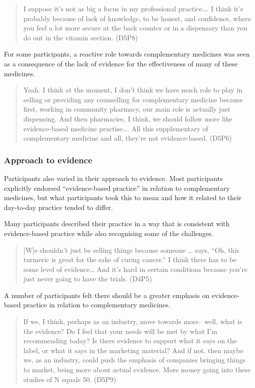 \documentclass[11pt,a4paper]{article}
\begin{document}
\begin{quote}
I suppose it's not as big a focus in my professional practice\ldots{}. I
think it's probably because of lack of knowledge, to be honest, and
confidence, where you feel a lot more secure at the back counter or in a
dispensary than you do out in the vitamin section. (D5P8)
\end{quote}

For some participants, a reactive role towards complementary medicines
was seen as a consequence of the lack of evidence for the effectiveness
of many of these medicines.

\begin{quote}
Yeah. I think at the moment, I don't think we have much role to play in
selling or providing any counselling for complementary medicine because
first, working in community pharmacy, our main role is actually just
dispensing. And then pharmacies, I think, we should follow more like
evidence-based medicine practise\ldots{}. All this supplementary of
complementary medicine and all, they're not evidence-based. (D5P6)
\end{quote}

\subsubsection{Approach to evidence}\label{approach-to-evidence}

Participants also varied in their approach to evidence. Most
participants explicitly endorsed ``evidence-based practice'' in relation
to complementary medicines, but what participants took this to mean and
how it related to their day-to-day practice tended to differ.

Many participants described their practice in a way that is consistent
with evidence-based practice while also recognising some of the
challenges.

\begin{quote}
{[}W{]}e shouldn't just be selling things because someone \ldots{} says,
``Oh, this turmeric is great for the sake of curing cancer.'' I think
there has to be some level of evidence\ldots{} And it's hard in certain
conditions because you're just never going to have the trials. (D4P5)
\end{quote}

A number of participants felt there should be a greater emphasis on
evidence-based practice in relation to complementary medicines.

\begin{quote}
If we, I think, perhaps as an industry, move towards more-- well, what
is the evidence? Do I feel that your needs will be met by what I'm
recommending today? Is there evidence to support what it says on the
label, or what it says in the marketing material? And if not, then maybe
we, as an industry, could push the emphasis of companies bringing things
to market, being more about actual evidence. More money going into these
studies of N equals 50. (D5P9)
\end{quote}
\end{document}
